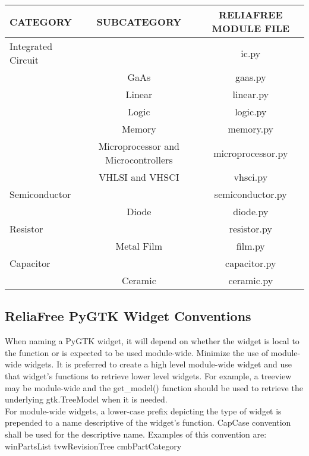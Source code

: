 \documentclass[11pt, 12pt, twoside, onecolumn]{article}
\begin{document}
    \begin{landscape}
    \begin{longtable}{lcc}
    CATEGORY & SUBCATEGORY & RELIAFREE MODULE FILE \\
    \hline
    Integrated Circuit & & ic.py \\
    & GaAs & gaas.py \\
    & Linear & linear.py \\
    & Logic & logic.py \\
    & Memory & memory.py \\
    & Microprocessor and Microcontrollers & microprocessor.py \\
    & VHLSI and VHSCI & vhsci.py \\
    \hline
    Semiconductor & & semiconductor.py \\
    & Diode & diode.py \\
    \hline
    Resistor & & resistor.py \\
    & Metal Film & film.py \\
    \hline
    Capacitor & & capacitor.py \\
    & Ceramic & ceramic.py \\
    \hline
    \end{longtable}
    \end{landscape}

\noindent

\subsection{\bf \large ReliaFree PyGTK Widget Conventions}

\noindent When naming a PyGTK widget, it will depend on whether the widget is local to the function or is expected to be used module-wide.  Minimize the use of module-wide widgets.  It is preferred to create a high level module-wide widget and use that widget's functions to retrieve lower level widgets.  For example, a treeview may be module-wide and the get\_model() function should be used to retrieve the underlying gtk.TreeModel when it is needed. \\

\noindent For module-wide widgets, a lower-case prefix depicting the type of widget is prepended to a name descriptive of the widget's function.  CapCase convention shall be used for the descriptive name.  Examples of this convention are: \\

    winPartsList
    tvwRevisionTree
    cmbPartCategory
\end{document}
